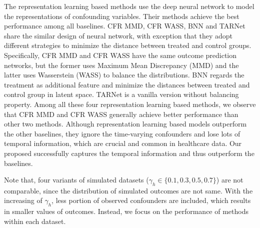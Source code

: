 The representation learning based methods use the deep neural network to model the representations of confounding variables. Their methods achieve the best performance among all baselines. CFR MMD, CFR WASS, BNN and TARNet share the similar design of neural network, with exception that they adopt different strategies to minimize the distance between treated and control groups. Specifically, CFR MMD and CFR WASS have the same outcome prediction networks, but the former uses Maximum Mean Discrepancy (MMD) and the latter uses Wasserstein (WASS) to balance the distributions. BNN regards the treatment as additional feature and minimize the distances between treated and control group in latent space. TARNet is a vanilla version without balancing property. Among all these four representation learning based methods, we observe that CFR MMD and CFR WASS generally achieve better performance than other two methods. Although representation learning based models outperform the other baselines, they ignore the time-varying confounders and lose lots of temporal information, which are crucial and common in healthcare data. Our proposed \model successfully captures the temporal information and thus outperform the baselines.

Note that, four variants of simulated datasets ($\gamma_{h}\in\{0.1,0.3,0.5,0.7\}$) are not comparable, since the distribution of simulated outcomes are not same. With the increasing of $\gamma_h$, less portion of observed confounders are included, which results in smaller values of outcomes. Instead, we focus on the performance of methods within each dataset. 




